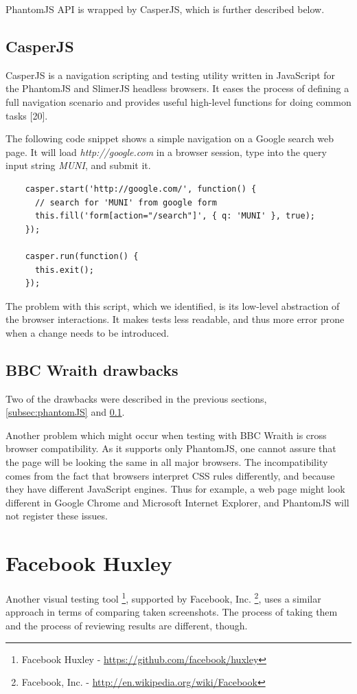 \documentclass[11pt,oneside,final]{fithesis2}
\begin{document}
    PhantomJS API is wrapped by CasperJS, which is further described below.
    
    \subsection{CasperJS}
    \label{subsec:casperJS}
    CasperJS is a navigation scripting and testing utility written in JavaScript for the PhantomJS and SlimerJS headless browsers. It eases the process of defining a full navigation scenario 
    and provides useful high-level functions for doing common tasks [20].
    
    The following code snippet shows a simple navigation on a Google search web page. It will load \textit{http://google.com} in a browser session, 
    type into the query input string \textit{MUNI}, and submit it.
    
    \begin{verbatim}
    casper.start('http://google.com/', function() {
      // search for 'MUNI' from google form
      this.fill('form[action="/search"]', { q: 'MUNI' }, true);
    });
   
    casper.run(function() {
      this.exit();
    });
    \end{verbatim}
    
    The problem with this script, which we identified, is its low-level abstraction of the browser interactions. It makes tests less readable, and thus more error prone when a change
    needs to be introduced.

    \subsection{BBC Wraith drawbacks}
    Two of the drawbacks were described in the previous sections, \ref{subsec:phantomJS} and \ref{subsec:casperJS}.
    
    Another problem which might occur when testing with BBC Wraith is cross browser compatibility. As it supports only PhantomJS, one cannot assure that the page will be 
    looking the same in all major browsers. The incompatibility comes from the fact that browsers interpret CSS rules differently, and because they have different JavaScript engines. 
    Thus for example, a web page might look different in Google Chrome and Microsoft Internet Explorer, and PhantomJS will not register these issues.

  \newpage
  \section{Facebook Huxley}
  Another visual testing tool \footnote{Facebook Huxley - \url{https://github.com/facebook/huxley}}, supported by Facebook, Inc. \footnote{Facebook, Inc. - \url{http://en.wikipedia.org/wiki/Facebook}}, uses a similar approach in terms of comparing taken screenshots. The process of taking them and the process
  of reviewing results are different, though.
  
\end{document}
